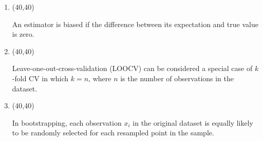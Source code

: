 \documentclass[11pt,twoside]{article}
\newcommand{\?}{\stackrel{?}{=}}
\begin{document}
\begin{enumerate}[\bf (i)]
  \smallskip
  
\item \hfill
  \begin{minipage}{.1\linewidth}
    \framebox(40,40){} %
  \end{minipage}\quad
  \begin{minipage}{.85\linewidth}
    An estimator is biased if the difference between its expectation and true value is zero.
  \end{minipage}

  \smallskip

\item \hfill
  \begin{minipage}{.1\linewidth}
    \framebox(40,40){}%
  \end{minipage}\quad
  \begin{minipage}{.85\linewidth}
    Leave-one-out-cross-validation (LOOCV) can be considered a special case of $k$-fold CV in which $k = n$, where $n$ is the number of observations in the dataset.
  \end{minipage}

\smallskip



\item \hfill
  \begin{minipage}{.1\linewidth}
    \framebox(40,40){} %
  \end{minipage}\quad
  \begin{minipage}{.85\linewidth}
    In bootstrapping, each observation $x_{i}$ in the original dataset is equally likely to be randomly selected for  each resampled point in the  sample.
  \end{minipage}


\end{enumerate}

 
\end{document}
